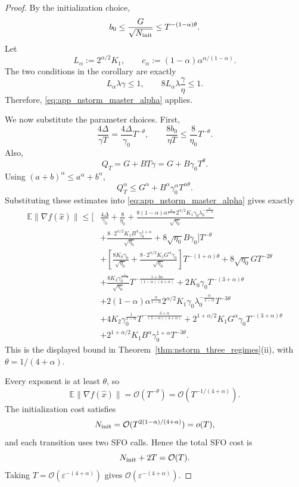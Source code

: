 \documentclass[letter,11pt]{article}
\newcommand{\E}{\mathbb{E}}
\newcommand{\Ocal}{\mathcal{O}}
\begin{document}
\begin{proof}
By the initialization choice,
\[
    b_0
    \le
    \frac{G}{\sqrt{N_{\rm init}}}
    \le
    T^{-(1-\alpha)\theta}.
\]
Let
\[
    L_\alpha:=2^{\alpha/2}K_1,
    \qquad
    c_\alpha:=(1-\alpha)\alpha^{\alpha/(1-\alpha)}.
\]
The two conditions in the corollary are exactly
\[
    L_\alpha\lambda\gamma\le1,
    \qquad
    8L_\alpha\lambda\frac{\gamma}{\eta}\le1.
\]
Therefore, \eqref{eq:app_nstorm_master_alpha} applies.

We now substitute the parameter choices. First,
\[
    \frac{4\Delta}{\gamma T}
    =
    \frac{4\Delta}{\gamma_0}T^{-\theta},
    \qquad
    \frac{8b_0}{\eta T}
    \le
    \frac{8}{\eta_0}T^{-\theta}.
\]
Also,
\[
    Q_T=G+BT\gamma
    =
    G+B\gamma_0T^\theta.
\]
Using \((a+b)^\alpha\le a^\alpha+b^\alpha\),
\[
    Q_T^\alpha
    \le
    G^\alpha+B^\alpha\gamma_0^\alpha T^{\alpha\theta}.
\]
Substituting these estimates into
\eqref{eq:app_nstorm_master_alpha} gives exactly
\[
\begin{aligned}
\E\|\nabla f(\widehat x)\|
\le \Bigg[&
\frac{4\Delta}{\gamma_0}
+
\frac{8}{\eta_0}
+
\frac{
8(1-\alpha)\alpha^{\frac{\alpha}{1-\alpha}}
2^{\alpha/2}K_1\gamma_0\lambda_0^{-\frac{\alpha}{1-\alpha}}
}{\sqrt{\eta_0}}
\\
&+
\frac{
8\cdot 2^{\alpha/2}K_1B^\alpha\gamma_0^{1+\alpha}
}{\sqrt{\eta_0}}
+
8\sqrt{\eta_0}B\gamma_0
\Bigg]T^{-\theta}
\\
&+
\left[
\frac{8K_0\gamma_0}{\sqrt{\eta_0}}
+
\frac{8\cdot 2^{\alpha/2}K_1G^\alpha\gamma_0}{\sqrt{\eta_0}}
\right]T^{-(1+\alpha)\theta}
+
8\sqrt{\eta_0}GT^{-2\theta}
\\
&+
\frac{
8K_2\gamma_0^{\frac1{1-\alpha}}
}{\sqrt{\eta_0}}
T^{-\frac{1+3\alpha}{(1-\alpha)(4+\alpha)}}
+
2K_0\gamma_0T^{-(3+\alpha)\theta}
\\
&+
2(1-\alpha)\alpha^{\frac{\alpha}{1-\alpha}}
2^{\alpha/2}K_1\gamma_0
\lambda_0^{-\frac{\alpha}{1-\alpha}}
T^{-3\theta}
\\
&+
4K_2\gamma_0^{\frac1{1-\alpha}}
T^{-\frac{3+\alpha}{(1-\alpha)(4+\alpha)}}
+
2^{1+\alpha/2}K_1G^\alpha\gamma_0
T^{-(3+\alpha)\theta}
\\
&+
2^{1+\alpha/2}K_1B^\alpha\gamma_0^{1+\alpha}
T^{-3\theta}.
\end{aligned}
\]
This is the displayed bound in Theorem~\ref{thm:nstorm_three_regimes}(ii),
with \(\theta=1/(4+\alpha)\).

Every exponent is at least \(\theta\), so
\[
    \E\|\nabla f(\widehat x)\|
    =
    \Ocal(T^{-\theta})
    =
    \Ocal(T^{-1/(4+\alpha)}).
\]
The initialization cost satisfies
\[
    N_{\rm init}
    =
    \Ocal(T^{2(1-\alpha)/(4+\alpha)})
    =
    o(T),
\]
and each transition uses two SFO calls. Hence the total SFO cost is
\[
    N_{\rm init}+2T=\Ocal(T).
\]
Taking \(T=\Ocal(\varepsilon^{-(4+\alpha)})\) gives
\(\Ocal(\varepsilon^{-(4+\alpha)})\).
\end{proof}
\end{document}
